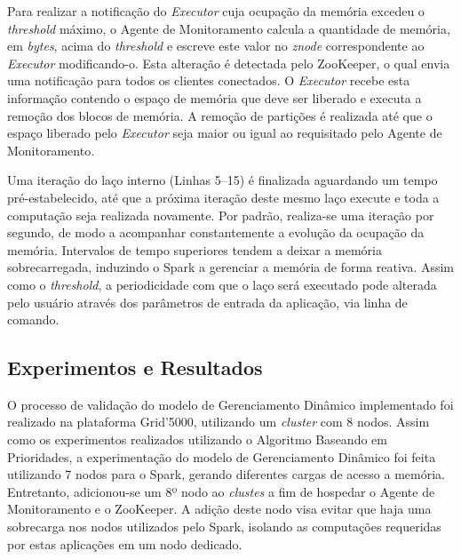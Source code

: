 Para realizar a notificação do \textit{Executor} cuja ocupação da memória excedeu o \textit{threshold} máximo, o Agente de Monitoramento calcula a quantidade de memória, em \textit{bytes}, acima do \textit{threshold} e escreve este valor no \textit{znode} correspondente ao \textit{Executor} modificando-o. Esta alteração é detectada pelo ZooKeeper, o qual envia uma notificação para todos os clientes conectados. O \textit{Executor} recebe esta informação contendo o espaço de memória que deve ser liberado e executa a remoção dos blocos de memória. A remoção de partições é realizada até que o espaço liberado pelo \textit{Executor} seja maior ou igual ao requisitado pelo Agente de Monitoramento.

Uma iteração do laço interno (Linhas 5--15) é finalizada aguardando um tempo pré-estabelecido, até que a próxima iteração deste mesmo laço execute e toda a computação seja realizada novamente. Por padrão, realiza-se uma iteração por segundo, de modo a acompanhar constantemente a evolução da ocupação da memória. Intervalos de tempo superiores tendem a deixar a memória sobrecarregada, induzindo o Spark a gerenciar a memória de forma reativa. Assim como o \textit{threshold}, a periodicidade com que o laço será executado pode alterada pelo usuário através dos parâmetros de entrada da aplicação, via linha de comando.


\subsection{Experimentos e Resultados}
O processo de validação do modelo de Gerenciamento Dinâmico implementado foi realizado na plataforma Grid'5000, utilizando um \textit{cluster} com 8 nodos. Assim como os experimentos realizados utilizando o Algoritmo Baseando em Prioridades, a experimentação do modelo de Gerenciamento Dinâmico foi feita utilizando 7 nodos para o Spark, gerando diferentes cargas de acesso a memória. Entretanto, adicionou-se um 8º nodo ao \textit{clustes} a fim de hospedar o Agente de Monitoramento e o ZooKeeper. A adição deste nodo visa evitar que haja uma sobrecarga nos nodos utilizados pelo Spark, isolando as computações requeridas por estas aplicações em um nodo dedicado.

